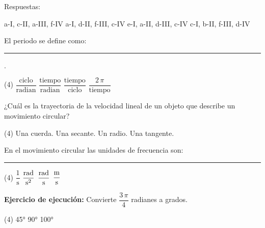 \documentclass[12pt, letter]{exam}
\begin{document}
\begin{questions}
\begin{multicols}{2}
    \end{multicols}
    
    \vspace*{0.25cm}
    Respuestas:
    \begin{multicols}{2}
    \begin{tasks}
        \task a-I, c-II, a-III, f-IV
        \task a-I, d-II, f-III, c-IV
        \task e-I, a-II, d-III, c-IV
        \task c-I, b-II, f-III, d-IV
    \end{tasks}
    \end{multicols}
    \question El periodo se define como: \rule{2cm}{0.1mm}.
    \begin{tasks}(4)
        \task $\dfrac{\text{ciclo}}{\text{radian}}$
        \task $\dfrac{\text{tiempo}}{\text{radian}}$
        \task $\dfrac{\text{tiempo}}{\text{ciclo}}$
        \task $\dfrac{2 \, \pi}{\text{tiempo}}$
    \end{tasks}
    \question ¿Cuál es la trayectoria de la velocidad lineal de un objeto que describe un movimiento circular?
    \begin{tasks}(4)
        \task Una cuerda.
        \task Una secante.
        \task Un radio.
        \task Una tangente.
    \end{tasks}
    \question En el movimiento circular las unidades de frecuencia son: \rule{2cm}{0.1mm}
    \begin{tasks}(4)
        \task $\dfrac{1}{\unit{\second}}$
        \task $\displaystyle \unit[per-mode=fraction]{\radian\per\square\second}$
        \task $\displaystyle \unit[per-mode=fraction]{\radian\per\second}$
        \task $\displaystyle \unit[per-mode=fraction]{\meter\per\second}$
    \end{tasks}
    \question \label{Ejercicio_01} \textbf{Ejercicio de ejecución: } Convierte $\dfrac{3 \, \pi}{4}$ radianes a grados.
    \begin{tasks}(4)
        \task \ang{45}
        \task \ang{90}
        \task \ang{100}

\end{tasks}
\end{questions}
\end{document}
